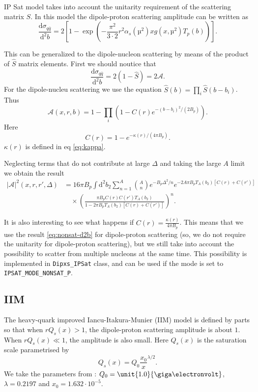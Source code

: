 \documentclass[a4paper,12pt]{article}
\newcommand{\code}[1]{\texttt{#1}}
\newcommand{\der}{\mathrm{d}}
\newcommand{\A}{\mathcal{A}}
\begin{document}
IP Sat model takes into account the unitarity requirement of the scattering matrix $S$. In this model the dipole-proton scattering amplitude can be written as \cite{PhysRevD.68.114005}
\begin{equation}
	\frac{\der \sigma_{q\bar q}}{\der^2 b} = 2\left[1- \exp \left(-\frac{\pi^2}{3\cdot 2}r^2 \alpha_s(µ^2)xg(x,µ^2) T_p(b)\right) \right].
\end{equation}

This can be generalized to the dipole-nucleon scattering by means of the product of $\hat S$ matrix elements. First we should noutice that
\begin{equation}
	\frac{\der \sigma_{q\bar q}}{\der^2 b} = 2(1-\hat S) = 2\A.	
\end{equation}
For the dipole-nucleu scattering we use the equation $\hat S(b) = \prod_i \hat S(b-b_i)$. Thus
\begin{equation}
	\label{eq:ipsat-a}
	\A(x,r,b) = 1 - \prod_i \left( 1-C(r)e^{-(b-b_i)^2/(2B_p)} \right).
\end{equation}
Here
\begin{equation}
	C(r) = 1-e^{-\kappa(r)/(4\pi B_p)}.
\end{equation}
$\kappa(r)$ is defined in eq \eqref{eq:kappa}.

Neglecting terms that do not contribute at large $\Delta$ and taking the large $A$ limit we obtain the result
\begin{equation}
\label{eq:ipsat-asqr}
\begin{split}
	|\A|^2(x,r,r',\Delta) &= 16\pi B_p \int \der^2 b_2 \sum_{n=1}^A \binom{A}{n} e^{-B_p \Delta^2/n} e^{-2A\pi B_p T_A(b_2)[C(r)+C(r')]} \\
	&\quad \times \left(\frac{\pi B_p C(r)C(r') T_A(b_2)}{1-2\pi B_p T_A(b_2)[C(r)+C(r')]}\right)^n.
\end{split}
\end{equation}

It is also interesting to see what happens if $C(r)=\frac{\kappa(r)}{4\pi B_p}$. This means that we use the result \eqref{eq:nonsat-d2b} for dipole-proton scattering (so, we do not require the unitarity for dipole-proton scattering), but we still take into account the possibility to scatter from multiple nucleons at the same time. This possibility is implemented in \code{Dipxs\_IPSat} class, and can be used if the mode is set to \code{IPSAT\_MODE\_NONSAT\_P}.

\subsection{IIM}
The heavy-quark improved Iancu-Itakura-Munier (IIM) model is defined by parts so that when $rQ_s(x)>1$, the dipole-proton scattering amplitude is about $1$. When $rQ_s(x) \ll 1$, the amplitude is also small. Here $Q_s(x)$ is the saturation scale parametrised by
\begin{equation}
	Q_s(x) = Q_0 \frac{x_0}{x}^{\lambda/2}.
\end{equation}
We take the parameters from \cite{Marquet:2007nf}: $Q_0 = \unit{1.0}{\giga\electronvolt}$, $\lambda = 0.2197$ and $x_0 = 1.632 \cdot 10^{-5}$.
\end{document}
